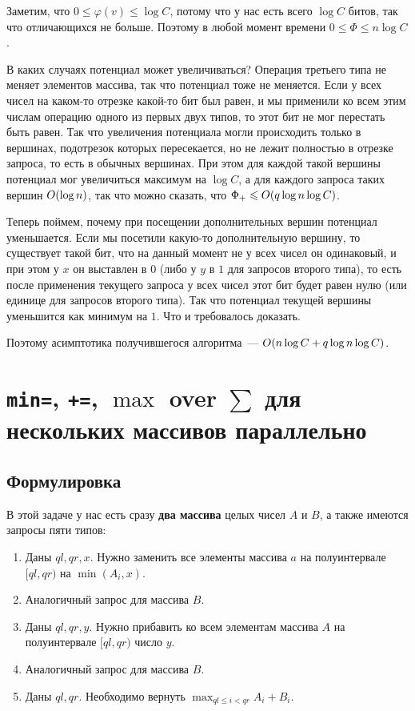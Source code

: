 Заметим, что $0 \le \varphi(v) \le \log C$, потому что у нас есть всего $\log C$ битов, так что отличающихся не больше. Поэтому в любой момент времени $0 \le \Phi \le n \log C$.

В каких случаях потенциал может увеличиваться? Операция третьего типа не меняет элементов массива, так что потенциал тоже не меняется. Если у всех чисел на каком-то отрезке какой-то бит был равен, и мы применили ко всем этим числам операцию одного из первых двух типов, то этот бит не мог перестать быть равен. Так что увеличения потенциала могли происходить только в вершинах, подотрезок которых пересекается, но не лежит полностью в отрезке запроса, то есть в обычных вершинах. При этом для каждой такой вершины потенциал мог увеличиться максимум на $\log C$, а для каждого запроса таких вершин $O(\log n)$, так что можно сказать, что $\Phi_+ \leqslant O(q \log n \log C)$.

Теперь поймем, почему при посещении дополнительных вершин потенциал уменьшается. Если мы посетили какую-то дополнительную вершину, то существует такой бит, что на данный момент не у всех чисел он одинаковый, и при этом у $x$ он выставлен в $0$ (либо у $y$ в $1$ для запросов второго типа), то есть после применения текущего запроса у всех чисел этот бит будет равен нулю (или единице для запросов второго типа). Так что потенциал текущей вершины уменьшится как минимум на $1$. Что и требовалось доказать.

Поэтому асимптотика получившегося алгоритма~--- $O(n \log C + q \log n \log C)$.





\cprotect \section{\verb+min=+, \verb^+=^, $\max$ over $\sum$ для нескольких массивов параллельно}

\subsection{Формулировка}

В этой задаче у нас есть сразу \textbf{два массива} целых чисел $A$ и $B$, а также имеются запросы пяти типов:

\begin{enumerate}
    \item Даны $ql, qr, x$. Нужно заменить все элементы массива $a$ на полуинтервале $[ql, qr)$ на $\min(A_i, x)$.
    \item Аналогичный запрос для массива $B$.
    \item Даны $ql, qr, y$. Нужно прибавить ко всем элементам массива $A$ на полуинтервале $[ql, qr)$ число $y$.
    \item Аналогичный запрос для массива $B$.
    \item Даны $ql, qr$. Необходимо вернуть $\max_{ql \le i < qr} A_i + B_i$.
\end{enumerate}

